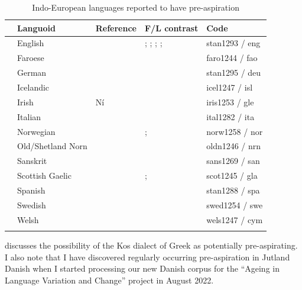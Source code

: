 \documentclass[output=paper]{langscibook}
\begin{document}
\begin{paperappendix}
\begin{table}
\begin{tabularx}{\textwidth}{@{}l@{}QQQl}
\lsptoprule
& Languoid & Reference & F/L contrast & Code\\
\midrule
  & English & \citet{HejnáEtAl2021} & \citet{GordeevaScobbie2013}; \citet[Chapter 6]{Hejná2015}; \citet{Hejná2016b}; \citet{HejnáJespersen2019}; \citet{HejnáKimper2019} & stan1293 / eng\\
& Faroese & \citet{Helgason2003} &  & faro1244 / fao\\
& German & \citet[2081-2082]{Tronnier2019} &  & stan1295 / deu\\
& Icelandic & \citet{Silverman2003} &  & icel1247 / isl\\
& Irish & Ní \citet{Chasaide1985} &  & iris1253 / gle\\
& Italian & \citet{Stevens2010} & \citet{stevenshajek2004} & ital1282 / ita\\
& Norwegian &   \citet{RingenDommelen2013} &  \citet{Dommelen1999};  \citet{RingenDommelen2013} & norw1258 / nor \\
& Old/Shetland Norn & \citet{Knooihuizen2013} &  & oldn1246 / nrn\\
& Sanskrit & \citet{Silverman2003} &  & sans1269 / san\\
& Scottish Gaelic & \citet{Silverman2003} &  \citet{NiChasaide:1985}; \citet{NanceStuart-Smith2013} & scot1245 / gla\\
& Spanish & \citet{Torreira2007} &  & stan1288 / spa\\
& Swedish & \citet{Helgason2002} & \citet{HelgasonRingen2008} & swed1254 / swe \\
& Welsh & \citet{MorrisHejná2020} & \citet{MorrisHejná2020} & wels1247 / cym\\
\lspbottomrule
\end{tabularx}
\parbox{\textwidth}{\raggedright \small
\citet{chapters/02_Iosad} discusses the possibility of the Kos dialect of Greek as  potentially pre-aspirating. I also note that I have discovered regularly occurring pre-aspiration in Jutland Danish when I started processing our new Danish corpus for the “Ageing in Language Variation and Change” project in  August 2022.
\caption{Indo-European languages reported to have pre-aspiration}
}
\label{tab:key:5}
\end{table}



\end{paperappendix}
\end{document}
